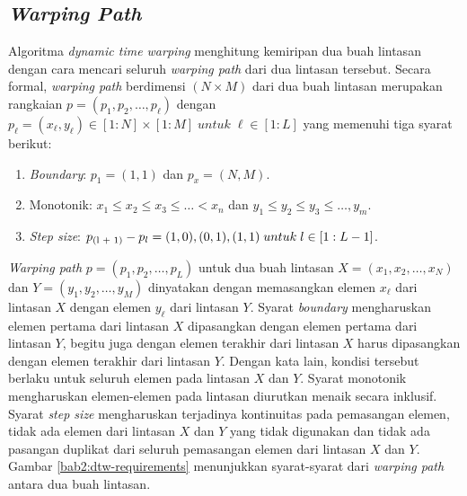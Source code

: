\subsection{\textit{Warping Path}}
\label{subsec:warping-path}

Algoritma \textit{dynamic time warping} menghitung kemiripan dua buah lintasan dengan cara mencari seluruh \textit{warping path} dari dua lintasan tersebut. Secara formal, \textit{warping path} berdimensi $(N \times M)$ dari dua buah lintasan merupakan rangkaian $p = (p_1, p_2, \ldots, p_\ell)$ dengan $p_\ell = (x_\ell, y_\ell) \in [1 : N] \times [1 : M]\;untuk\;\ell \in [1 : L]$ yang memenuhi tiga syarat berikut:

\begin{enumerate}
    \item \textit{Boundary}: $p_1 = (1, 1)$ dan $p_x = (N, M)$.
    \item Monotonik: $x_1 \leq x_2 \leq x_3 \leq \ldots < x_n$ dan $y_1 \leq y_2 \leq y_3 \leq \ldots, y_m$.
    \item \textit{Step size}: $p\textsubscript{(l + 1)} - p_l = {(1, 0), (0, 1), (1, 1)}\;untuk\; l \in [1 : L - 1]$.
\end{enumerate}

\textit{Warping path} $p = (p_1, p_2, \ldots, p_L)$ untuk dua buah lintasan $X = (x_1, x_2, \ldots, x_N)$ dan $Y = (y_1, y_2, \ldots, y_M)$ dinyatakan dengan memasangkan elemen $x_\ell$ dari lintasan $X$ dengan elemen $y_\ell$ dari lintasan $Y$. Syarat \textit{boundary} mengharuskan elemen pertama dari lintasan $X$ dipasangkan dengan elemen pertama dari lintasan $Y$, begitu juga dengan elemen terakhir dari lintasan $X$ harus dipasangkan dengan elemen terakhir dari lintasan $Y$. Dengan kata lain, kondisi tersebut berlaku untuk seluruh elemen pada lintasan $X$ dan $Y$. Syarat monotonik mengharuskan elemen-elemen pada lintasan diurutkan menaik secara inklusif. Syarat \textit{step size} mengharuskan terjadinya kontinuitas pada pemasangan elemen, tidak ada elemen dari lintasan $X$ dan $Y$ yang tidak digunakan dan tidak ada pasangan duplikat dari seluruh pemasangan elemen dari lintasan $X$ dan $Y$. Gambar \ref{bab2:dtw-requirements} menunjukkan syarat-syarat dari \textit{warping path} antara dua buah lintasan.

